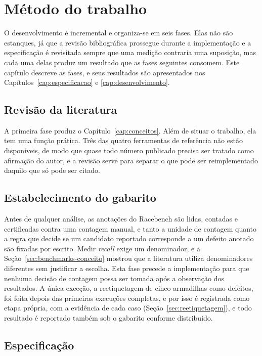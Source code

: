 \chapter{Método do trabalho} \label{cap:metodo}

O desenvolvimento é incremental e organiza-se em seis fases. Elas não são
estanques, já que a revisão bibliográfica prossegue durante a implementação e a
especificação é revisitada sempre que uma medição contraria uma suposição, mas
cada uma delas produz um resultado que as fases seguintes consomem. Este
capítulo descreve as fases, e seus resultados são apresentados nos
Capítulos~\ref{cap:especificacao} e \ref{cap:desenvolvimento}.

\section{Revisão da literatura}
\label{sec:fase-revisao}

A primeira fase produz o Capítulo~\ref{cap:conceitos}. Além de situar o
trabalho, ela tem uma função prática. Três das quatro ferramentas de
referência não estão disponíveis, de modo que quase todo número publicado
precisa ser tratado como afirmação do autor, e a revisão serve para separar o
que pode ser reimplementado daquilo que só pode ser citado.

\section{Estabelecimento do gabarito}
\label{sec:fase-gabarito}

Antes de qualquer análise, as anotações do Racebench são lidas, contadas e
certificadas contra uma contagem manual, e tanto a unidade de contagem quanto a
regra que decide se um candidato reportado corresponde a um defeito anotado são
fixadas por escrito. Medir \textit{recall} exige um denominador, e a
Seção~\ref{sec:benchmarks-conceito} mostrou que a literatura utiliza
denominadores diferentes sem justificar a escolha. Esta fase precede a
implementação para que nenhuma decisão de contagem possa ser
tomada após a observação dos resultados. A única exceção, a reetiquetagem de
cinco armadilhas como defeitos, foi feita depois das primeiras execuções
completas, e por isso é registrada como etapa própria, com a evidência de cada
caso (Seção~\ref{sec:reetiquetagem}), e todo resultado é reportado também sob
o gabarito conforme distribuído.

\section{Especificação}
\label{sec:fase-especificacao}

